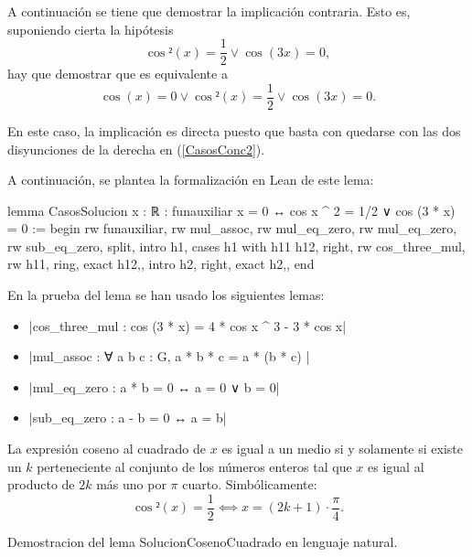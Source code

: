 \begin{demostracion}
  \noindent
  \framebox{\longleftarrow} A continuación se tiene que demostrar
  la implicación contraria. Esto es, suponiendo cierta la
  hipótesis
  \begin{equation}\label{Casosh2}\tag{h2}
    \cos²(x)=\frac{1}{2} \lor \cos(3x)=0,
  \end{equation}
  hay que demostrar que es equivalente a
  \begin{equation}\label{CasosConc2}
    \cos(x)=0 \lor \cos²(x)=\frac{1}{2}\lor \cos(3x)=0.
  \end{equation}

  En este caso, la implicación es directa puesto que basta con
  quedarse con las dos disyunciones de la derecha en
  (\ref{CasosConc2}).
\end{demostracion}

A continuación, se plantea la formalización en Lean de este lema:
\begin{leancode}
lemma CasosSolucion {x : ℝ} :
funauxiliar x = 0 ↔ cos x ^ 2 = 1/2 ∨ cos (3 * x) = 0 :=
begin
  rw funauxiliar,
  rw mul_assoc,
  rw mul_eq_zero,
  rw mul_eq_zero,
  rw sub_eq_zero,
  split,
  {intro h1,
  cases h1 with h11 h12,
  right,
  rw cos_three_mul,
  rw h11,
  ring,
  exact h12,},
  {intro h2,
  right,
  exact h2,},
end
\end{leancode}

En la prueba del lema se han usado los siguientes lemas:
\begin{itemize}
\item {}|cos_three_mul : cos (3 * x) = 4 * cos x ^ 3 - 3 * cos x|
\item {}|mul_assoc : ∀ a b c : G, a * b * c = a * (b * c) |
\item {}|mul_eq_zero : a * b = 0 ↔ a = 0 ∨ b = 0|
\item {}|sub_eq_zero : a - b = 0 ↔ a = b|
\end{itemize}

\begin{lema}[SolucionCosenoCuadrado]La expresión coseno al
  cuadrado de \(x\) es igual a un medio si y solamente si
  existe un \(k\) perteneciente al conjunto de los números
  enteros tal que \(x\) es igual al producto de \(2k\) más
  uno por \(π\) cuarto. Simbólicamente:
  \begin{equation}
    \cos²(x)=\frac{1}{2} ⟺ x=(2k+1)⋅\frac{π}{4}.
  \end{equation}
\end{lema}
\begin{demostracion}
  Demostracion del lema SolucionCosenoCuadrado en lenguaje
  natural.
\end{demostracion}

